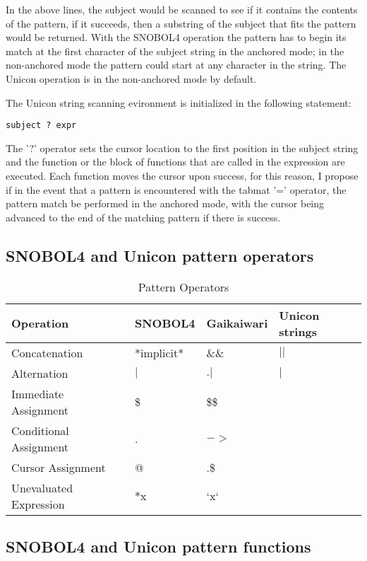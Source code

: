 \documentclass{article}
\begin{document}
In the above lines, the subject would be scanned to see if it contains the contents of the pattern, if it succeeds, then a substring of the subject that fits the pattern would be returned.  With the SNOBOL4 operation the pattern has to begin its match at the first character of the subject string in the anchored mode; in the non-anchored mode the pattern could start at any character in the string. \cite{Snobol}  The Unicon operation is in the non-anchored mode by default. \cite{Gaikaiwari2005}

The Unicon string scanning evironment is initialized in the following statement:

\begin{verbatim}
subject ? expr
\end{verbatim}

The '?' operator sets the cursor location to the first position in the subject string and the function or the block of functions that are called in the expression are executed.  Each function moves the cursor upon success, for this reason, I propose if in the event that a pattern is encountered with the tabmat '=' operator, the pattern match be performed in the anchored mode, with the cursor being advanced to the end of the matching pattern if there is success.

\subsection{SNOBOL4 and Unicon pattern operators}



\begin{table}[ht]
	\caption{Pattern Operators}
	\centering
	\begin{tabular}{|l|l|l|l|}
		\hline\hline
		Operation & SNOBOL4 & Gaikaiwari & Unicon strings\\
		\hline
		Concatenation & *implicit* & \&\& & $||$\\
		Alternation & $|$ & $.|$ & $|$\\
		\hline
		Immediate Assignment & \$ & \$\$ & \\
		Conditional Assignment & . & $->$ & \\
		Cursor Assignment & @ & .\$ & \\
		\hline
		Unevaluated Expression & $*$x & `x` & \\
		\hline
	\end{tabular}
\end{table}

\subsection{SNOBOL4 and Unicon pattern functions}
\end{document}
